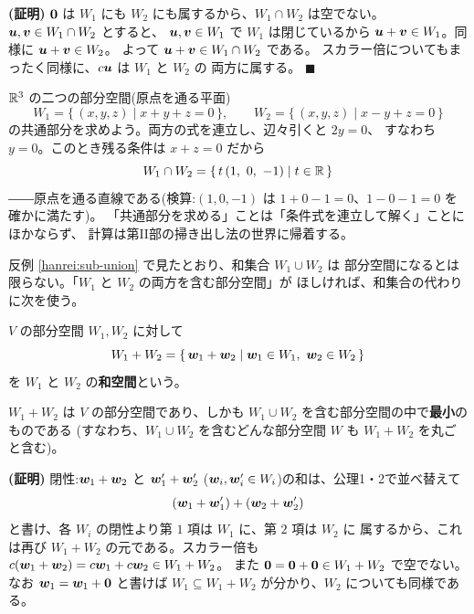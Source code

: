 \noindent\textbf{(証明)}\quad
$\bm{0}$ は $W_1$ にも $W_2$ にも属するから、$W_1 \cap W_2$ は空でない。
$\bm{u}, \bm{v} \in W_1 \cap W_2$ とすると、
$\bm{u}, \bm{v} \in W_1$ で $W_1$ は閉じているから
$\bm{u} + \bm{v} \in W_1$。同様に $\bm{u} + \bm{v} \in W_2$。
よって $\bm{u} + \bm{v} \in W_1 \cap W_2$ である。
スカラー倍についてもまったく同様に、$c\bm{u}$ は $W_1$ と $W_2$ の
両方に属する。 $\blacksquare$

\begin{rei}[二つの平面の共通部分]\label{rei:sub-cap}
$\mathbb{R}^3$ の二つの部分空間(原点を通る平面)
\[
W_1 = \{\, (x, y, z) \mid x + y + z = 0 \,\}, \qquad
W_2 = \{\, (x, y, z) \mid x - y + z = 0 \,\}
\]
の共通部分を求めよう。両方の式を連立し、辺々引くと $2y = 0$、
すなわち $y = 0$。このとき残る条件は $x + z = 0$ だから
\[
W_1 \cap W_2 = \{\, t\,(1,\ 0,\ -1) \mid t \in \mathbb{R} \,\}
\]
――原点を通る直線である(検算:$(1, 0, -1)$ は
$1 + 0 - 1 = 0$、$1 - 0 - 1 = 0$ を確かに満たす)。
「共通部分を求める」ことは「条件式を連立して解く」ことにほかならず、
計算は第II部の掃き出し法の世界に帰着する。
\end{rei}

反例 \ref{hanrei:sub-union} で見たとおり、和集合 $W_1 \cup W_2$ は
部分空間になるとは限らない。「$W_1$ と $W_2$ の両方を含む部分空間」が
ほしければ、和集合の代わりに次を使う。

\begin{teigi}[和空間]\label{def:sub-sum}
$V$ の部分空間 $W_1, W_2$ に対して
\[
W_1 + W_2 = \{\, \bm{w}_1 + \bm{w}_2 \mid
\bm{w}_1 \in W_1,\ \bm{w}_2 \in W_2 \,\}
\]
を $W_1$ と $W_2$ の\textbf{和空間}という。
\end{teigi}

\begin{teiri}[和空間は部分空間]\label{thm:sub-sum}
$W_1 + W_2$ は $V$ の部分空間であり、しかも
$W_1 \cup W_2$ を含む部分空間の中で\textbf{最小}のものである
(すなわち、$W_1 \cup W_2$ を含むどんな部分空間 $W$ も
$W_1 + W_2$ を丸ごと含む)。
\end{teiri}

\noindent\textbf{(証明)}\quad
閉性:$\bm{w}_1 + \bm{w}_2$ と $\bm{w}'_1 + \bm{w}'_2$
($\bm{w}_i, \bm{w}'_i \in W_i$)の和は、公理1・2で並べ替えて
\[
(\bm{w}_1 + \bm{w}'_1) + (\bm{w}_2 + \bm{w}'_2)
\]
と書け、各 $W_i$ の閉性より第 $1$ 項は $W_1$ に、第 $2$ 項は $W_2$ に
属するから、これは再び $W_1 + W_2$ の元である。スカラー倍も
$c(\bm{w}_1 + \bm{w}_2) = c\bm{w}_1 + c\bm{w}_2 \in W_1 + W_2$。
また $\bm{0} = \bm{0} + \bm{0} \in W_1 + W_2$ で空でない。
なお $\bm{w}_1 = \bm{w}_1 + \bm{0}$ と書けば
$W_1 \subseteq W_1 + W_2$ が分かり、$W_2$ についても同様である。

